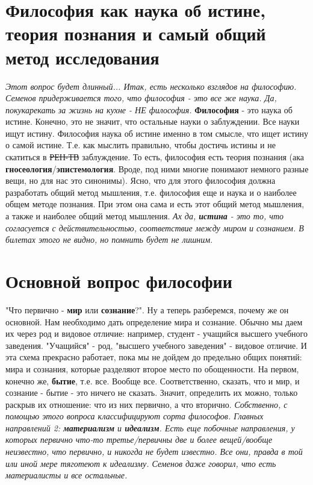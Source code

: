 \section{Философия как наука об истине, теория познания и самый общий метод исследования}
\textit{Этот вопрос будет длинный... Итак, есть несколько взглядов на философию. Семенов придерживается того, что философия - это все же наука. Да, покукарекать за жизнь на кухне - НЕ философия.} \textbf{Философия} - это наука об истине. Конечно, это не значит, что остальные науки о заблуждении. Все науки ищут истину. Философия наука об истине именно в том смысле, что ищет истину о самой истине. Т.е. как мыслить правильно, чтобы достичь истины и не скатиться в \sout{РЕН-ТВ} заблуждение. То есть, философия есть теория познания (ака \textbf{гносеология}/\textbf{эпистемология}. Вроде, под ними многие понимают немного разные вещи, но для нас это синонимы). Ясно, что для этого философия должна разработать общий метод мышления, т.е. философия еще и наука и о наиболее общем методе познания. При этом она сама и есть этот общий метод мышления, а также и наиболее общий метод мышления. \textit{Ах да, \textbf{истина} - это то, что согласуется с действительностью, соответствие между миром и сознанием. В билетах этого не видно, но помнить будет не лишним}. 

\section{Основной вопрос философии}
"Что первично - \textbf{мир} или \textbf{сознание}?". Ну а теперь разберемся, почему же он основной. Нам необходимо дать определение мира и сознание. Обычно мы даем их через род и видовое отличие: например, студент - учащийся высшего учебного заведения. "Учащийся" - род, "высшего учебного заведения" - видовое отличие. И эта схема прекрасно работает, пока мы не дойдем до предельно общих понятий: мира и сознания, которые разделяют второе место по обощенности. На первом, конечно же, \textbf{бытие}, т.е. все. Вообще все. Соответственно, сказать, что и мир, и сознание - бытие - это ничего не сказать. Значит, определить их можно, только раскрыв их отношение: что из них первично, а что вторично. \textit{Собственно, с помощью этого вопроса классифицируют сорта философов. Главных направлений 2: \textbf{материализм} и \textbf{идеализм}. Есть еще побочные направления, у которых первично что-то третье/первичны две и более вещей/вообще неизвестно, что первично, и никогда не будет известно. Все они, правда в той или иной мере тяготеют к идеализму. Семенов даже говорил, что есть материалисты и все остальные.}

